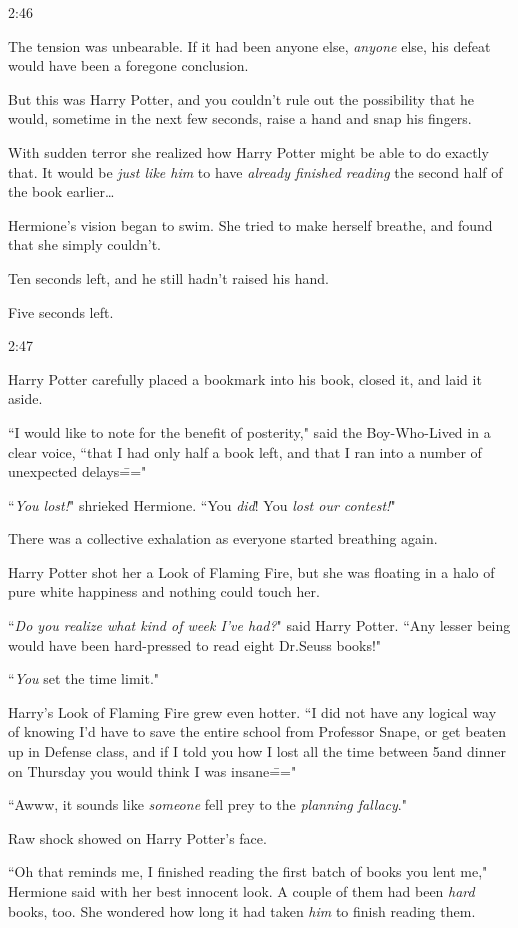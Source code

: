 2:46\pm

The tension was unbearable. If it had been anyone else, \emph{anyone} else, his defeat would have been a foregone conclusion.

But this was Harry Potter, and you couldn't rule out the possibility that he would, sometime in the next few seconds, raise a hand and snap his fingers.

With sudden terror she realized how Harry Potter might be able to do exactly that. It would be \emph{just like him} to have \emph{already finished reading} the second half of the book earlier{\ldots}

Hermione's vision began to swim. She tried to make herself breathe, and found that she simply couldn't.

Ten seconds left, and he still hadn't raised his hand.

Five seconds left.

2:47\pm

Harry Potter carefully placed a bookmark into his book, closed it, and laid it aside.

``I would like to note for the benefit of posterity," said the Boy-Who-Lived in a clear voice, ``that I had only half a book left, and that I ran into a number of unexpected delays\==="

``\emph{You lost!}" shrieked Hermione. ``You \emph{did}! You \emph{lost our contest!}"

There was a collective exhalation as everyone started breathing again.

Harry Potter shot her a Look of Flaming Fire, but she was floating in a halo of pure white happiness and nothing could touch her.

``\emph{Do you realize what kind of week I've had?}" said Harry Potter. ``Any lesser being would have been hard-pressed to read eight Dr.\?Seuss books!"

``\emph{You} set the time limit."

Harry's Look of Flaming Fire grew even hotter. ``I did not have any logical way of knowing I'd have to save the entire school from Professor Snape, or get beaten up in Defense class, and if I told you how I lost all the time between 5\pm and dinner on Thursday you would think I was insane\==="

``Awww, it sounds like \emph{someone} fell prey to the \emph{planning fallacy}."

Raw shock showed on Harry Potter's face.

``Oh that reminds me, I finished reading the first batch of books you lent me," Hermione said with her best innocent look. A couple of them had been \emph{hard} books, too. She wondered how long it had taken \emph{him} to finish reading them.

